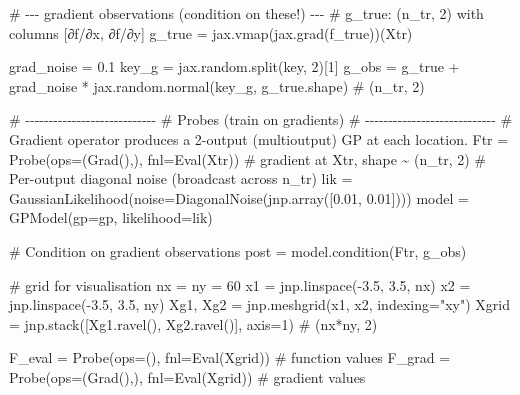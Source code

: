 \documentclass[
  letterpaper,
  DIV=11,
  numbers=noendperiod]{scrartcl}
\newenvironment{Shaded}{\begin{snugshade}}{\end{snugshade}}
\newcommand{\CommentTok}[1]{\textcolor[rgb]{0.37,0.37,0.37}{#1}}
\newcommand{\DecValTok}[1]{\textcolor[rgb]{0.68,0.00,0.00}{#1}}
\newcommand{\FloatTok}[1]{\textcolor[rgb]{0.68,0.00,0.00}{#1}}
\newcommand{\NormalTok}[1]{\textcolor[rgb]{0.00,0.23,0.31}{#1}}
\newcommand{\OperatorTok}[1]{\textcolor[rgb]{0.37,0.37,0.37}{#1}}
\newcommand{\StringTok}[1]{\textcolor[rgb]{0.13,0.47,0.30}{#1}}
\begin{document}
\begin{Shaded}
\begin{Highlighting}[]
\CommentTok{\# {-}{-}{-} gradient observations (condition on these!) {-}{-}{-}}
\CommentTok{\# g\_true: (n\_tr, 2) with columns [∂f/∂x, ∂f/∂y]}
\NormalTok{g\_true }\OperatorTok{=}\NormalTok{ jax.vmap(jax.grad(f\_true))(Xtr)}

\NormalTok{grad\_noise }\OperatorTok{=} \FloatTok{0.1}
\NormalTok{key\_g }\OperatorTok{=}\NormalTok{ jax.random.split(key, }\DecValTok{2}\NormalTok{)[}\DecValTok{1}\NormalTok{]}
\NormalTok{g\_obs }\OperatorTok{=}\NormalTok{ g\_true }\OperatorTok{+}\NormalTok{ grad\_noise }\OperatorTok{*}\NormalTok{ jax.random.normal(key\_g, g\_true.shape)  }\CommentTok{\# (n\_tr, 2)}

\CommentTok{\# {-}{-}{-}{-}{-}{-}{-}{-}{-}{-}{-}{-}{-}{-}{-}{-}{-}{-}{-}{-}{-}{-}{-}{-}{-}{-}{-}{-}}
\CommentTok{\# Probes (train on gradients)}
\CommentTok{\# {-}{-}{-}{-}{-}{-}{-}{-}{-}{-}{-}{-}{-}{-}{-}{-}{-}{-}{-}{-}{-}{-}{-}{-}{-}{-}{-}{-}}
\CommentTok{\# Gradient operator produces a 2{-}output (multioutput) GP at each location.}
\NormalTok{Ftr   }\OperatorTok{=}\NormalTok{ Probe(ops}\OperatorTok{=}\NormalTok{(Grad(),), fnl}\OperatorTok{=}\NormalTok{Eval(Xtr))        }\CommentTok{\# gradient at Xtr, shape \textasciitilde{} (n\_tr, 2)}
\CommentTok{\# Per{-}output diagonal noise (broadcast across n\_tr)}
\NormalTok{lik   }\OperatorTok{=}\NormalTok{ GaussianLikelihood(noise}\OperatorTok{=}\NormalTok{DiagonalNoise(jnp.array([}\FloatTok{0.01}\NormalTok{, }\FloatTok{0.01}\NormalTok{])))}
\NormalTok{model }\OperatorTok{=}\NormalTok{ GPModel(gp}\OperatorTok{=}\NormalTok{gp, likelihood}\OperatorTok{=}\NormalTok{lik)}

\CommentTok{\# Condition on gradient observations}
\NormalTok{post  }\OperatorTok{=}\NormalTok{ model.condition(Ftr, g\_obs)}

\CommentTok{\# grid for visualisation}
\NormalTok{nx }\OperatorTok{=}\NormalTok{ ny }\OperatorTok{=} \DecValTok{60}
\NormalTok{x1 }\OperatorTok{=}\NormalTok{ jnp.linspace(}\OperatorTok{{-}}\FloatTok{3.5}\NormalTok{, }\FloatTok{3.5}\NormalTok{, nx)}
\NormalTok{x2 }\OperatorTok{=}\NormalTok{ jnp.linspace(}\OperatorTok{{-}}\FloatTok{3.5}\NormalTok{, }\FloatTok{3.5}\NormalTok{, ny)}
\NormalTok{Xg1, Xg2 }\OperatorTok{=}\NormalTok{ jnp.meshgrid(x1, x2, indexing}\OperatorTok{=}\StringTok{"xy"}\NormalTok{)}
\NormalTok{Xgrid }\OperatorTok{=}\NormalTok{ jnp.stack([Xg1.ravel(), Xg2.ravel()], axis}\OperatorTok{=}\DecValTok{1}\NormalTok{)     }\CommentTok{\# (nx*ny, 2)}

\NormalTok{F\_eval }\OperatorTok{=}\NormalTok{ Probe(ops}\OperatorTok{=}\NormalTok{(),        fnl}\OperatorTok{=}\NormalTok{Eval(Xgrid))            }\CommentTok{\# function values}
\NormalTok{F\_grad }\OperatorTok{=}\NormalTok{ Probe(ops}\OperatorTok{=}\NormalTok{(Grad(),), fnl}\OperatorTok{=}\NormalTok{Eval(Xgrid))            }\CommentTok{\# gradient values}


\end{Highlighting}
\end{Shaded}
\end{document}
